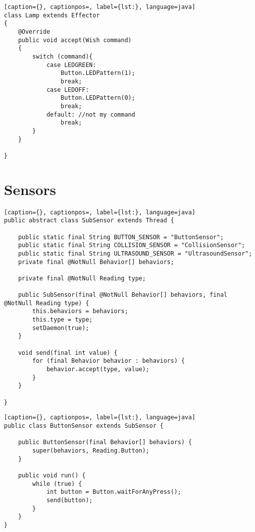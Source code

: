 \begin{lstlisting}[caption={}, captionpos=, label={lst:}, language=java]
class Lamp extends Effector
{
	@Override
	public void accept(Wish command)
	{
		switch (command){
			case LEDGREEN:
				Button.LEDPattern(1);
				break;
			case LEDOFF:
				Button.LEDPattern(0);
				break;
			default: //not my command
				break;
		}
	}

}
\end{lstlisting}

\section{Sensors}

\begin{lstlisting}[caption={}, captionpos=, label={lst:}, language=java]
public abstract class SubSensor extends Thread {

	public static final String BUTTON_SENSOR = "ButtonSensor";
	public static final String COLLISION_SENSOR = "CollisionSensor";
	public static final String ULTRASOUND_SENSOR = "UltrasoundSensor";
	private final @NotNull Behavior[] behaviors;

	private final @NotNull Reading type;

	public SubSensor(final @NotNull Behavior[] behaviors, final @NotNull Reading type) {
		this.behaviors = behaviors;
		this.type = type;
		setDaemon(true);
	}

	void send(final int value) {
		for (final Behavior behavior : behaviors) {
			behavior.accept(type, value);
		}
	}

}
\end{lstlisting}

\begin{lstlisting}[caption={}, captionpos=, label={lst:}, language=java]
public class ButtonSensor extends SubSensor {

    public ButtonSensor(final Behavior[] behaviors) {
        super(behaviors, Reading.Button);
    }

    public void run() {
        while (true) {
            int button = Button.waitForAnyPress();
            send(button);
        }
    }
}
\end{lstlisting}

